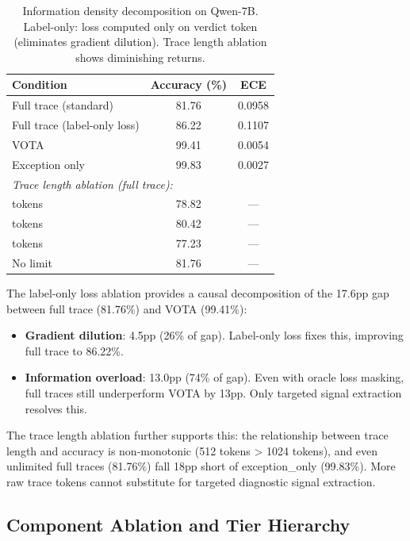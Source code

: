 \documentclass[11pt]{article}
\begin{document}
\begin{table}[h]
\centering
\caption{Information density decomposition on Qwen-7B. Label-only: loss computed only on verdict token (eliminates gradient dilution). Trace length ablation shows diminishing returns.}
\label{tab:density}
\small
\begin{tabular}{lcc}
\toprule
\textbf{Condition} & \textbf{Accuracy (\%)} & \textbf{ECE} \\
\midrule
Full trace (standard) & 81.76 & 0.0958 \\
Full trace (label-only loss) & 86.22 & 0.1107 \\
VOTA & 99.41 & 0.0054 \\
Exception only & 99.83 & 0.0027 \\
\midrule
\multicolumn{3}{l}{\textit{Trace length ablation (full trace):}} \\
\quad 256 tokens & 78.82 & --- \\
\quad 512 tokens & 80.42 & --- \\
\quad 1024 tokens & 77.23 & --- \\
\quad No limit & 81.76 & --- \\
\bottomrule
\end{tabular}
\end{table}

The label-only loss ablation provides a causal decomposition of the 17.6pp gap between full trace (81.76\%) and VOTA (99.41\%):

\begin{itemize}
\item \textbf{Gradient dilution}: 4.5pp (26\% of gap). Label-only loss fixes this, improving full trace to 86.22\%.
\item \textbf{Information overload}: 13.0pp (74\% of gap). Even with oracle loss masking, full traces still underperform VOTA by 13pp. Only targeted signal extraction resolves this.
\end{itemize}

The trace length ablation further supports this: the relationship between trace length and accuracy is non-monotonic (512 tokens > 1024 tokens), and even unlimited full traces (81.76\%) fall 18pp short of exception\_only (99.83\%). More raw trace tokens cannot substitute for targeted diagnostic signal extraction.

\subsection{Component Ablation and Tier Hierarchy}
\end{document}
